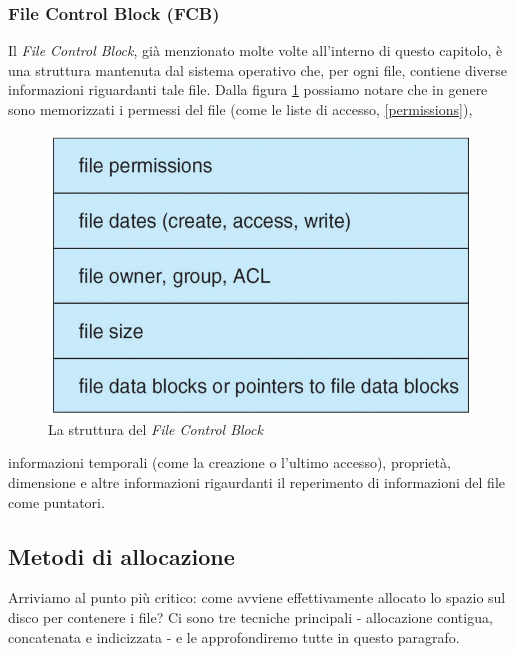 \subsubsection{File Control Block (FCB)}\label{FCB}
Il \textit{File Control Block}, già menzionato molte volte all'interno di questo capitolo, è una struttura mantenuta dal sistema operativo che, per ogni file, contiene diverse informazioni riguardanti tale file. Dalla figura \ref{fig:FCB} possiamo notare che in genere sono memorizzati i permessi del file (come le liste di accesso, \ref{permissions}),
\begin{figure}[h]
    \centering
    \includegraphics[width = .45\textwidth]{../res/imgs/file system implementation/FCB.png}
    \caption{La struttura del \textit{File Control Block}}
    \label{fig:FCB}
\end{figure}
informazioni temporali (come la creazione o l'ultimo accesso), proprietà, dimensione e altre informazioni rigaurdanti il reperimento di informazioni del file come puntatori. 

% 
\subsection{Metodi di allocazione}
Arriviamo al punto più critico: come avviene effettivamente allocato lo spazio sul disco per contenere i file? Ci sono tre tecniche principali - allocazione contigua, concatenata e indicizzata - e le approfondiremo tutte in questo paragrafo.

